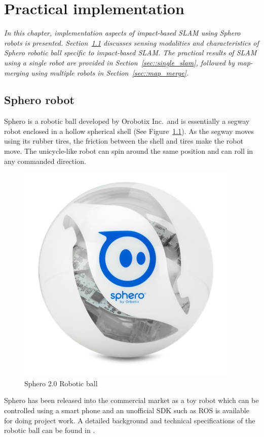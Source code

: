 \chapter{Practical implementation} \label{chap::implementation}
{\it \centering In this chapter, implementation aspects of impact-based SLAM using Sphero robots is presented. Section~\ref{sec::sphero} discusses sensing modalities and characteristics of Sphero robotic ball specific to impact-based SLAM. The practical results of SLAM using a single robot are provided in Section~\ref{sec::single_slam}, followed by map-merging using multiple robots in Section~\ref{sec::map_merge}.}

\section{Sphero robot} \label{sec::sphero}
Sphero is a robotic ball developed by Orobotix Inc.\ and is essentially a segway robot enclosed in a hollow spherical shell (See Figure~\ref{sphero_ball}). As the segway moves using its rubber tires, the friction between the shell and tires make the robot move. The unicycle-like robot can spin around the same position and can roll in any commanded direction. 

\begin{figure}
\centering
\includegraphics[scale=0.25]{./images/sphero_revealed}
\caption[Sphero 2.0 Robotic ball]{Sphero 2.0 Robotic ball}
\label{sphero_ball}
\end{figure}

Sphero has been released into the commercial market as a toy robot which can be controlled using a smart phone and an unofficial \acf{SDK} such as ROS \cite{spheroros} is available for doing project work. A detailed background and technical specifications of the robotic ball can be found in \cite{spherorobot}.

